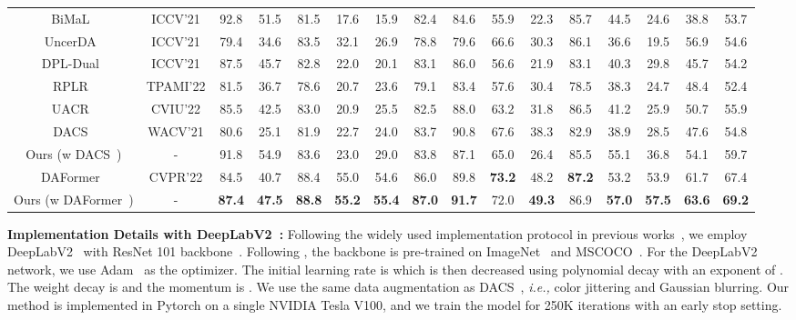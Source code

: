 \documentclass[journal]{IEEEtran}
\begin{document}
{\begin{minipage}{\textwidth}
\begin{table*}[t]
{\begin{tabular}{c|c|ccccccccccccc|c}
BiMaL~\cite{truong2021bimal} &ICCV'21 & 92.8 & 51.5 & 81.5  & 17.6 & 15.9 & 82.4 & 84.6 & 55.9 & 22.3 & 85.7 & 44.5 & 24.6 & 38.8 & 53.7 \\
UncerDA~\cite{wang2021uncertainty} &ICCV'21 &79.4 &34.6 &83.5 &32.1 &26.9 &78.8 &79.6 &66.6 &30.3 &86.1 &36.6 &19.5 &56.9 &54.6 \\
DPL-Dual~\cite{cheng2021dual} &ICCV'21 &87.5  &45.7  &82.8 &22.0  &20.1  &83.1  &86.0  &56.6  &21.9  &83.1  &40.3  &29.8  &45.7 &54.2 \\
RPLR~\cite{li2022featurere}& TPAMI'22 &81.5 &36.7  &78.6  &20.7  &23.6  &79.1  &83.4  &57.6  &30.4  &78.5  &38.3  &24.7  &48.4  &52.4\\
UACR~\cite{zhou2020uncertainty} &CVIU'22 &85.5 &42.5 &83.0 &20.9 &25.5 &82.5 &88.0 &63.2 &31.8 &86.5 &41.2 &25.9 &50.7  &55.9\\
\midrule
DACS~\cite{tranheden2020dacs} & WACV'21 &80.6 &25.1 &81.9 &22.7 &24.0 &83.7 &90.8 &67.6 &38.3 &82.9 &38.9 &28.5 &47.6 &54.8 \\
Ours (w DACS~\cite{tranheden2020dacs}) &- &91.8 &54.9 &83.6 &23.0 &29.0 &83.8 &87.1 &65.0 &26.4 &85.5 &55.1 &36.8 &54.1  &59.7\\
\midrule
DAFormer~\cite{hoyer2022daformer} & CVPR'22 &84.5 &40.7 &88.4 &55.0 &54.6 &86.0 &89.8 &\textbf{73.2} &48.2 &\textbf{87.2} &53.2 &53.9 &61.7 &67.4\\
Ours (w DAFormer~\cite{hoyer2022daformer}) &- & 
\textbf{87.4} & \textbf{47.5} & \textbf{88.8} & \textbf{55.2} & \textbf{55.4} & \textbf{87.0} & \textbf{91.7} & 72.0 & \textbf{49.3} & 86.9 & \textbf{57.0} & \textbf{57.5} & \textbf{63.6} & \textbf{69.2} \\
\bottomrule
\end{tabular}}
\end{table*}
\noindent
\textbf{Implementation Details with DeepLabV2~\cite{chen2018deeplab}:}
Following the widely used implementation protocol in previous works~\cite{tranheden2020dacs,liu2021bapa,BDL,AdaptSegNet,FDA}, we employ DeepLabV2~\cite{chen2018deeplab} with ResNet 101 backbone~\cite{he2016deep}. Following \cite{tranheden2020dacs,olsson2021classmix,liu2021bapa}, the backbone is pre-trained on ImageNet~\cite{deng2009imagenet} and MSCOCO~\cite{COCO}. For the DeepLabV2 network, we use Adam~\cite{kingma2014adam} as the optimizer. The initial learning rate is   which is then decreased using polynomial decay with an exponent of . The weight decay is   and the momentum is . We use the same data augmentation as DACS~\cite{tranheden2020dacs}, \emph{i.e.,} color jittering and Gaussian blurring.  Our method is implemented in Pytorch on a single NVIDIA Tesla V100, and we train the model for 250K iterations with an early stop setting. 


\end{minipage}}
\end{document}
